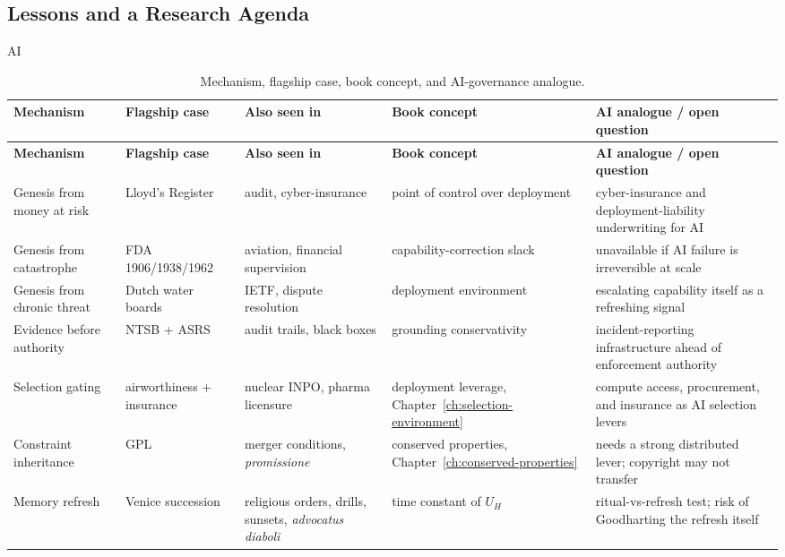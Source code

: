 \begin{refsection}
\section{Lessons and a Research Agenda}
\label{sec:appm-lessons}
\begin{authbar}{AI}
\renewcommand{\arraystretch}{1.2}
\end{authbar}
\begin{longtable}{@{}p{}p{}p{}p{}p{}@{}}
\caption{Mechanism, flagship case, book concept, and AI-governance analogue.}\label{tab:appm-summary}\\
\toprule
\textbf{Mechanism} & \textbf{Flagship case} & \textbf{Also seen in} & \textbf{Book concept} & \textbf{AI analogue / open question} \\
\midrule
\endfirsthead
\toprule
\textbf{Mechanism} & \textbf{Flagship case} & \textbf{Also seen in} & \textbf{Book concept} & \textbf{AI analogue / open question} \\
\midrule
\endhead
\bottomrule
\endfoot
Genesis from money at risk & Lloyd's Register & audit, cyber-insurance & point of control over deployment & cyber-insurance and deployment-liability underwriting for AI \\
Genesis from catastrophe & FDA 1906/1938/1962 & aviation, financial supervision & capability-correction slack & unavailable if AI failure is irreversible at scale \\
Genesis from chronic threat & Dutch water boards & IETF, dispute resolution & deployment environment & escalating capability itself as a refreshing signal \\
Evidence before authority & NTSB + ASRS & audit trails, black boxes & grounding conservativity & incident-reporting infrastructure ahead of enforcement authority \\
Selection gating & airworthiness + insurance & nuclear INPO, pharma licensure & deployment leverage, Chapter~\ref{ch:selection-environment} & compute access, procurement, and insurance as AI selection levers \\
Constraint inheritance & {GPL} & merger conditions, \emph{promissione} & conserved properties, Chapter~\ref{ch:conserved-properties} & needs a strong distributed lever; copyright may not transfer \\
Memory refresh & Venice succession & religious orders, drills, sunsets, \emph{advocatus diaboli} & time constant of \(U_H\) & ritual-vs-refresh test; risk of Goodharting the refresh itself \\

\end{longtable}
\end{refsection}

